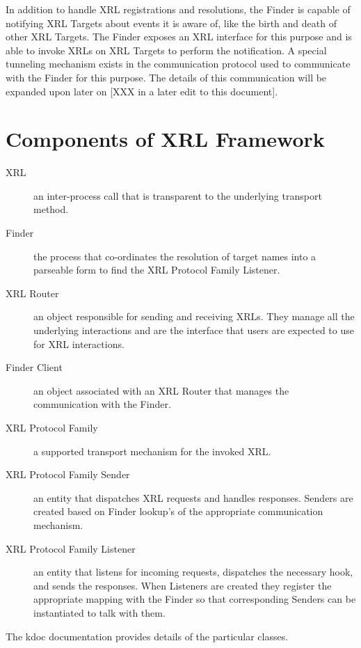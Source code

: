 \documentclass[11pt]{article}
\begin{document}
In addition to handle XRL registrations and resolutions, the Finder is
capable of notifying XRL Targets about events it is aware of, like the
birth and death of other XRL Targets.  The Finder exposes an XRL
interface for this purpose and is able to invoke XRLs on XRL Targets
to perform the notification.  A special tunneling mechanism exists in
the communication protocol used to communicate with the Finder for
this purpose.  The details of this communication will be expanded upon
later on [XXX in a later edit to this document].

\section{Components of XRL Framework}

\begin{description}
\item [XRL] an inter-process call that is transparent to the
underlying transport method.

\item [Finder] the process that co-ordinates the resolution of target
names into a parseable form to find the XRL Protocol Family Listener.

\item [XRL Router] an object responsible for sending and receiving
XRLs.  They manage all the underlying interactions and are the
interface that users are expected to use for XRL interactions.

\item [Finder Client] an object associated with an XRL Router that
manages the communication with the Finder.

\item [XRL Protocol Family] a supported transport mechanism for the
invoked XRL.

\item [XRL Protocol Family Sender] an entity that dispatches XRL
requests and handles responses.  Senders are created based on Finder
lookup's of the appropriate communication mechanism.

\item [XRL Protocol Family Listener] an entity that listens for
incoming requests, dispatches the necessary hook, and sends the
responses.  When Listeners are created they register the appropriate
mapping with the Finder so that corresponding Senders can be
instantiated to talk with them.

\end{description}

The kdoc documentation provides details of the particular classes.



\end{document}
